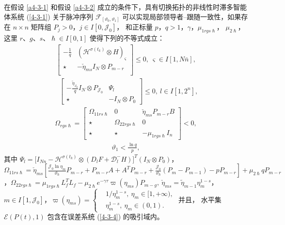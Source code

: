 \begin{theorem}\label{t4-3-1} 
    在假设 \ref{a4-3-1} 和假设 \ref{a4-3-2} 成立的条件下，具有切换拓扑的非线性时滞多智能体系统 (\ref{4-3-1}) 关于脉冲序列 $\mathscr{F}_{[\vartheta_0,\vartheta_1]}$ 可以实现局部领导者--跟随一致性，如果存在 $n\times n$ 矩阵组 $P_{j}>0$，$j\in I[0,\mathcal{J}_0]$， 和正标量 $p$，$q>1$，$\gamma$，$ \mu_{1rgs\hslash}$， $\mu_{2\hslash}$，这里 $r$、$g$、$s$、$\hslash\in I[0,1]$ 使得下列的不等式成立： 
    \begin{align}\label{4-3-7} 
    \left[ \begin{array}{cc}
    -\frac{1}{q}&  (\mathcal{H}^{\sigma(t_k)}\otimes H)_\varsigma\\
    \star&-\check{\eta}_{ms}I_N\otimes P_{m-r}  \\
    \end{array}
    \right]\leq 0,\ \varsigma\in I[1,N\bar{n} ], 
    \end{align} 
    \begin{align} \label{4-3-8} 
    &\left[ \begin{array}{cc}
    -\frac{\tilde{\eta}_{J_0}}{q}I_N\otimes P_{\mathcal{J}_0}& \varPsi_{l}\\
    \star&-I_N\otimes P_0
    \end{array}
    \right]\leq0,\ l\in I[1,2^n],
    \end{align}
    \begin{align}\label{4-3-9} 
    \varOmega_{rgs\hslash}= \left[ \begin{array}{ccc}
    \varOmega_{11rs\hslash} &0& \check{\eta}_{ms}P_{m-r}B \\
    \star&\varOmega_{22rgs\hslash} &0 \\
    \star&\star&-\mu_{1rgs\hslash                            }I_n  
    \end{array}
    \right]< 0,
    \end{align} 
    \begin{align}\label{4-3-10} 
    \vartheta_1<\frac{\ln q}{p},
    \end{align} 
    其中 $ \varPsi_{l}= [I_{Nn}- \mathcal{H}^{\sigma(t_k)} \otimes (D_{l}F+\mathscr{D}_{l}^-H)\big]^T(I_N\otimes P_0)$，$    
    \varOmega_{11rs\hslash}= 
     \check{\eta}_{ms}[\frac{\mathcal{J}_0 \ln \eta_m}{\vartheta_{\hslash}} P_{m-r}+P_{m-r}A+A^TP_{m-r}+\frac{\mathcal{J}_0}{\vartheta_{\hslash}} (P_m-P_{m-1})-p P_{m-r}]
    +\mu_{2\hslash} qP_{m-r}$，$  
    \varOmega_{22rgs\hslash}= \mu_{1rgs\hslash}L^T_f L_f-\mu_{2\hslash}
    e^{-\gamma\tau}\varpi(\eta_{ms})P_{m-g},\ 
    \check{\eta}_{ms}=\tilde{\eta}_{m-1}\eta^{1-s}_{m}$，$ m\in I[1,\mathcal{J}_0]$，$
    \varpi(\eta_{ms})= \left\{ \begin{aligned}
     &1/\eta^{1-s}_{m},\ \eta_{m}\in[1,+\infty),\\ 
     &\eta^{1-s}_{m},\ \eta_{m}\in(0,1).\end{aligned}\right.
$ 并且， 水平集 $ \mathscr{E} ( P(t),1)$ 包含在误差系统 (\ref{4-3-4}) 的吸引域内。
\end{theorem}

